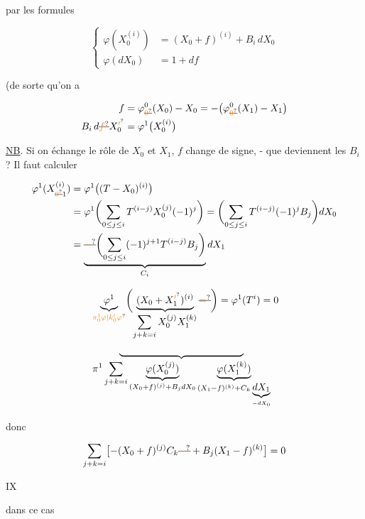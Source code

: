 par les formules

\[
\left\{\begin{aligned}
\varphi(X_0^{(i)})&=(X_0+f)^{(i)}+B_i\,dX_0\\
\varphi(dX_0)&=1+df
\end{aligned}\right.
\]

(de sorte qu'on a

\[
\begin{aligned}
 f&=\varphi_{\deleted{\unsure{0}}}^{0}(X_0)-X_0=-\bigl(\varphi_{\deleted{\unsure{0}}}^{0}(X_1)-X_1\bigr)\\
 B_i\,d\deleted{\unsure{f}}X_0^{\unsure{\prime}}&=\varphi^1\bigl(X_0^{(i)}\bigr)
\end{aligned}
\]

\uline{NB}. Si on échange le rôle de $X_0$ et $X_1$, $f$ change de signe, - que deviennent les $B_i$ ? Il faut calculer

\[
\begin{aligned}
\varphi^1(X_{\deleted{\unsure{0}}1}^{(i)})&=\varphi^1\bigl((T-X_0)^{(i)}\bigr)\\
&=\varphi^1\biggl(\sum_{0\leq j\leq i}T^{(i-j)}X_0^{(j)}(-1)^j\biggr)
=\biggl(\sum_{0\leq j\leq i} T^{(i-j)}(-1)^j B_j\biggr)dX_0\\
&=\underbrace{\deleted{\unsure{-}}\biggl(\sum_{0\leq j\leq i}(-1)^{j+1} T^{(i-j)} B_j\biggr)}_{C_i}dX_1
\end{aligned}
\]

 

\[
\begin{aligned}
&\underbrace{\varphi^1}_{\unsure{\pi_0^1\varphi|k'_0\varphi}}
\biggl(\underbrace{(X_0+X_1^{\unsure{\prime}})^{(i)}}_{\displaystyle\sum_{j+k=i}X_0^{(j)}X_1^{(k)}}\deleted{\unsure{=}}\biggr)
=\varphi^1(T^i)=0\\
&\underbrace{\hspace{4.4cm}}_{\displaystyle\pi^1\sum_{j+k=i}
\underbrace{\varphi(X_0^{(j)})}_{(X_0+f)^{(j)}+B_jdX_0}
\underbrace{\varphi(X_1^{(k)})}_{(X_1-f)^{(k)}+C_k\underbrace{dX_1}_{-dX_0}}}
\end{aligned}
\]

donc

\[
\sum_{j+k=i}\bigl[-(X_0+f)^{(j)}C_k\deleted{\unsure{-}}+B_j(X_1-f)^{(k)}\bigr]=0
\]


\hfill IX

dans ce cas

